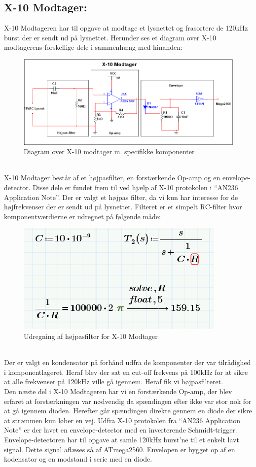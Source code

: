 \documentclass[11pt]{article}
\begin{document}
\subsection{X-10 Modtager: }
X-10 Modtageren har til opgave at modtage et lysnettet og frasortere de 120kHz burst der er sendt ud på lysnettet. Herunder ses et diagram over X-10 modtagerens forskellige dele i sammenhæng med hinanden:
\begin{figure}[!h]
\centering
\includegraphics[scale = 0.7]{X-10modtager}
\caption{Diagram over X-10 modtager m. specifikke komponenter}
\end{figure}\\
X-10 Modtager består af et højpasfilter, en forstærkende Op-amp og en envelope-detector. Disse dele er fundet frem til ved hjælp af X-10 protokolen i ``AN236 Application Note''. Der er valgt et højpas filter, da vi kun har interesse for de højfrekvenser der er sendt ud på lysnettet. Filteret er et simpelt RC-filter hvor komponentværdierne er udregnet på følgende måde:
\begin{figure}[!h]
\centering
\includegraphics[scale = 0.8]{Hojspas-modtager}
\caption{Udregning af højpasfilter for X-10 Modtager}
\end{figure}\\
Der er valgt en kondensator på forhånd udfra de komponenter der var tilrådighed i komponentlageret. Heraf blev der sat en cut-off frekvens på 100kHz for at sikre at alle frekvenser på 120kHz ville gå igennem. Heraf fik vi højpasfilteret. \\
Den næste del i X-10 Modtageren har vi en forstærkende Op-amp, der blev erfaret at forstærkningen var nødvendig da spændingen efter ikke var stor nok for at gå igennem dioden. Herefter går spændingen direkte gennem en diode der sikre at strømmen kun løber en vej. Udfra X-10 protokolen fra ``AN236 Application Note'' er der lavet en envelope-detector med en inverterende Schmidt-trigger. Envelope-detectoren har til opgave at samle 120kHz burst'ne til et enkelt lavt signal. Dette signal aflæses så af ATmega2560. Envelopen er bygget op af en kodensator og en modstand i serie med en diode. 
\end{document}
